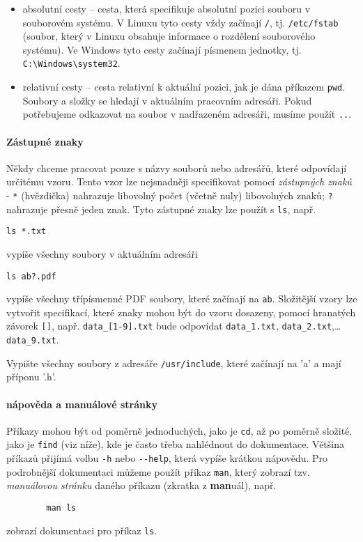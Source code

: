 \begin{itemize}
  \item
    absolutní cesty -- cesta, která specifikuje absolutní pozici souboru v souborovém systému. V Linuxu tyto cesty vždy začínají \verb|/|, tj. \verb|/etc/fstab| (soubor, který v Linuxu obsahuje informace o rozdělení souborového systému). Ve Windows tyto cesty začínají písmenem jednotky, tj. \verb|C:\Windows\system32|.
  \item
    relativní cesty -- cesta relativní k aktuální pozici, jak je dána příkazem \verb|pwd|. Soubory a složky se hledají v aktuálním pracovním adresáři. Pokud potřebujeme odkazovat na soubor v nadřazeném adresáři, musíme použít \verb|..|.
  \end{itemize}

\paragraph{Zástupné znaky}
Někdy chceme pracovat pouze s názvy souborů nebo adresářů, které odpovídají určitému vzoru. Tento vzor lze nejsnadněji specifikovat pomocí \emph{zástupných znaků} - \verb|*| (hvězdička) nahrazuje libovolný počet (včetně nuly) libovolných znaků; \verb|?| nahrazuje přesně jeden znak. Tyto zástupné znaky lze použít s \verb|ls|, např.
\begin{verbatim}
ls *.txt
\end{verbatim}
  vypíše všechny soubory  v aktuálním adresáři
\begin{verbatim}
ls ab?.pdf    
\end{verbatim}
  vypíše všechny třípísmenné PDF soubory, které začínají na \verb|ab|. Složitější vzory lze vytvořit specifikací, které znaky mohou být do vzoru dosazeny, pomocí hranatých závorek \verb|[]|,
  např. \verb|data_[1-9].txt| bude odpovídat \verb|data_1.txt|, \verb|data_2.txt|,\ldots\verb|data_9.txt|.

    \begin{exercise}
    Vypište všechny soubory z adresáře \verb|/usr/include|, které začínají na 'a' a mají příponu '.h'.
    \end{exercise}

\paragraph{nápověda a manuálové stránky}
 Příkazy mohou být od poměrně jednoduchých, jako je \verb|cd|, až po poměrně složité, jako je \verb|find| (viz níže), kde je často třeba nahlédnout do dokumentace. Většina příkazů přijímá volbu \verb|-h| nebo \verb|--help|, která vypíše krátkou nápovědu. Pro podrobnější dokumentaci můžeme použít příkaz \verb|man|, který zobrazí tzv. \emph{manuálovou stránku} daného příkazu (zkratka z \textbf{man}uál), např.
    \begin{verbatim}
        man ls
\end{verbatim}
zobrazí dokumentaci pro příkaz \verb|ls|.


